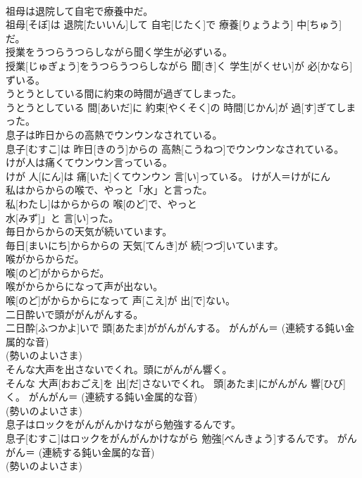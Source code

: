 \documentclass[8pt]{extreport}
\begin{document}
\begin{CJK}{UTF8}{min}
{\\	祖母は退院して自宅で療養中だ。	
\\	祖母[そぼ]は 退院[たいいん]して 自宅[じたく]で 療養[りょうよう] 中[ちゅう]だ。	
\\	授業をうつらうつらしながら聞く学生が必ずいる。	
\\	授業[じゅぎょう]をうつらうつらしながら 聞[き]く 学生[がくせい]が 必[かなら]ずいる。	
\\	うとうとしている間に約束の時間が過ぎてしまった。	
\\	うとうとしている 間[あいだ]に 約束[やくそく]の 時間[じかん]が 過[す]ぎてしまった。	
\\	息子は昨日からの高熱でウンウンなされている。	
\\	息子[むすこ]は 昨日[きのう]からの 高熱[こうねつ]でウンウンなされている。	
\\	けが人は痛くてウンウン言っている。	
\\	けが 人[にん]は 痛[いた]くてウンウン 言[い]っている。	けが人＝けがにん
\\	私はからからの喉で、やっと「水」と言った。	
\\	私[わたし]はからからの 喉[のど]で、やっと
\\	水[みず]」と 言[い]った。	
\\	毎日からからの天気が続いています。	
\\	毎日[まいにち]からからの 天気[てんき]が 続[つづ]いています。	
\\	喉がからからだ。	
\\	喉[のど]がからからだ。	
\\	喉がからからになって声が出ない。	
\\	喉[のど]がからからになって 声[こえ]が 出[で]ない。	
\\	二日酔いで頭ががんがんする。	
\\	二日酔[ふつかよ]いで 頭[あたま]ががんがんする。	がんがん＝ (連続する鈍い金属的な音) 
\\	(勢いのよいさま)
\\	そんな大声を出さないでくれ。頭にがんがん響く。	
\\	そんな 大声[おおごえ]を 出[だ]さないでくれ。 頭[あたま]にがんがん 響[ひび]く。	がんがん＝ (連続する鈍い金属的な音) 
\\	(勢いのよいさま)
\\	息子はロックをがんがんかけながら勉強するんです。	
\\	息子[むすこ]はロックをがんがんかけながら 勉強[べんきょう]するんです。	がんがん＝ (連続する鈍い金属的な音) 
\\	(勢いのよいさま)
}
\end{CJK}
\end{document}
